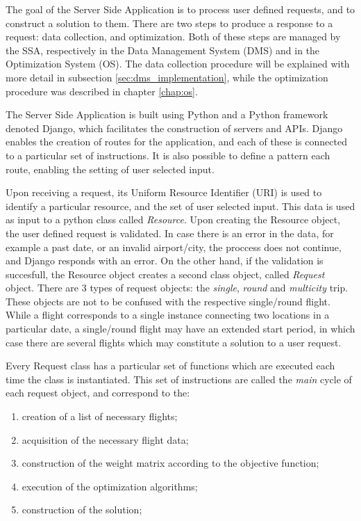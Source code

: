 
The goal of the Server Side Application is to process user defined requests, and to construct a solution to them. There are two steps to produce a response to a request: data collection, and optimization. Both of these steps are managed by the SSA, respectively in the Data Management System (DMS) and in the Optimization System (OS). The data collection procedure will be explained with more detail in subsection \ref{sec:dms_implementation}, while the optimization procedure was described in chapter \ref{chap:os}.

The Server Side Application is built using Python and a Python framework denoted Django, which facilitates the construction of servers and APIs. Django enables the creation of routes for the application, and each of these is connected to a particular set of instructions. It is also possible to define a pattern each route, enabling the setting of user selected input. 

Upon receiving a request, its Uniform Resource Identifier (URI) is used to identify a particular resource, and the set of user selected input. This data is used as input to a python class called \textit{Resource}. Upon creating the Resource object, the user defined request is validated. In case there is an error in the data, for example a past date, or an invalid airport/city, the proccess does not continue, and Django responds with an error. On the other hand, if the validation is succesfull, the Resource object creates a second class object, called \textit{Request} object. There are 3 types of request objects: the \textit{single}, \textit{round} and \textit{multicity} trip. These objects are not to be confused with the respective single/round flight. While a flight corresponds to a single instance connecting two locations in a particular date, a single/round flight may have an extended start period, in which case there are several flights which may constitute a solution to a user request.

Every Request class has a particular set of functions which are executed each time the class is instantiated. This set of instructions are called the \textit{main} cycle of each request object, and correspond to the:

\begin{enumerate}[noitemsep,topsep=0pt,parsep=0pt,partopsep=0pt]
  \item creation of a list of necessary flights;
  \item acquisition of the necessary flight data;
  \item construction of the weight matrix according to the objective function;
  \item execution of the optimization algorithms;
  \item construction of the solution;
\end{enumerate}

